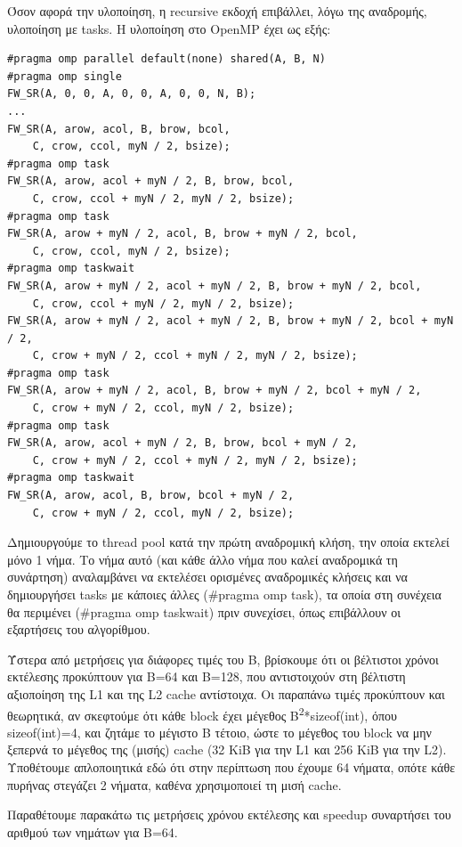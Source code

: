 \documentclass[12pt,titlepage]{article}
\begin{document}
Όσον αφορά την υλοποίηση, η recursive εκδοχή επιβάλλει, λόγω της αναδρομής,
υλοποίηση με tasks. Η υλοποίηση στο OpenMP έχει ως εξής:

\begin{verbatim}
#pragma omp parallel default(none) shared(A, B, N)
#pragma omp single
FW_SR(A, 0, 0, A, 0, 0, A, 0, 0, N, B);
...
FW_SR(A, arow, acol, B, brow, bcol,
    C, crow, ccol, myN / 2, bsize);
#pragma omp task
FW_SR(A, arow, acol + myN / 2, B, brow, bcol,
    C, crow, ccol + myN / 2, myN / 2, bsize);
#pragma omp task
FW_SR(A, arow + myN / 2, acol, B, brow + myN / 2, bcol,
    C, crow, ccol, myN / 2, bsize);
#pragma omp taskwait
FW_SR(A, arow + myN / 2, acol + myN / 2, B, brow + myN / 2, bcol,
    C, crow, ccol + myN / 2, myN / 2, bsize);
FW_SR(A, arow + myN / 2, acol + myN / 2, B, brow + myN / 2, bcol + myN / 2,
    C, crow + myN / 2, ccol + myN / 2, myN / 2, bsize);
#pragma omp task
FW_SR(A, arow + myN / 2, acol, B, brow + myN / 2, bcol + myN / 2,
    C, crow + myN / 2, ccol, myN / 2, bsize);
#pragma omp task
FW_SR(A, arow, acol + myN / 2, B, brow, bcol + myN / 2,
    C, crow + myN / 2, ccol + myN / 2, myN / 2, bsize);
#pragma omp taskwait
FW_SR(A, arow, acol, B, brow, bcol + myN / 2,
    C, crow + myN / 2, ccol, myN / 2, bsize);
\end{verbatim}

Δημιουργούμε το thread pool κατά την πρώτη αναδρομική κλήση, την οποία εκτελεί
μόνο 1 νήμα. Το νήμα αυτό (και κάθε άλλο νήμα που καλεί αναδρομικά τη συνάρτηση)
αναλαμβάνει να εκτελέσει ορισμένες αναδρομικές κλήσεις και να δημιουργήσει tasks
με κάποιες άλλες (\#pragma omp task), τα οποία στη συνέχεια θα περιμένει
(\#pragma omp taskwait) πριν συνεχίσει, όπως επιβάλλουν οι εξαρτήσεις του
αλγορίθμου.

Ύστερα από μετρήσεις για διάφορες τιμές του B, βρίσκουμε ότι οι βέλτιστοι χρόνοι
εκτέλεσης προκύπτουν για B=64 και B=128, που αντιστοιχούν στη βέλτιστη
αξιοποίηση της L1 και της L2 cache αντίστοιχα. Οι παραπάνω τιμές προκύπτουν και
θεωρητικά, αν σκεφτούμε ότι κάθε block έχει μέγεθος
B\textsuperscript2*sizeof(int), όπου sizeof(int)=4, και ζητάμε το μέγιστο B
τέτοιο, ώστε το μέγεθος του block να μην ξεπερνά το μέγεθος της (μισής) cache (32
KiB για την L1 και 256 KiB για την L2). Υποθέτουμε απλοποιητικά εδώ ότι στην
περίπτωση που έχουμε 64 νήματα, οπότε κάθε πυρήνας στεγάζει 2 νήματα, καθένα
χρησιμοποιεί τη μισή cache.

Παραθέτουμε παρακάτω τις μετρήσεις χρόνου εκτέλεσης και speedup συναρτήσει του
αριθμού των νημάτων για B=64.
\end{document}
